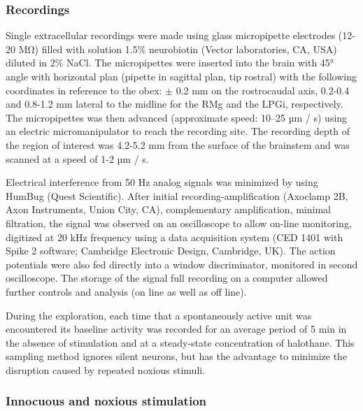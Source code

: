 \documentclass[a4paper,12pt,twoside]{report}
\begin{document}
\subsubsection{Recordings}

Single extracellular recordings were made using glass micropipette electrodes (12-20 MΩ) filled with solution 1.5\% neurobiotin (Vector laboratories, CA, USA) diluted in 2\% NaCl. The micropipettes were inserted into the brain with 45° angle with horizontal plan (pipette in sagittal plan, tip rostral) with the following coordinates in reference to the obex: $\pm$ 0.2 mm on the rostrocaudal axis, 0.2-0.4 and 0.8-1.2 mm lateral to the midline for the RMg and the LPGi, respectively. The micropipettes was then advanced (approximate speed: 10–25 µm / s) using an electric micromanipulator to reach the recording site. The recording depth of the region of interest was 4.2-5.2 mm from the surface of the brainstem and was scanned at a speed of 1-2 µm / s.

Electrical interference from 50 Hz analog signals was minimized by using HumBug (Quest Scientific). After initial recording-amplification (Axoclamp 2B, Axon Instruments, Union City, CA), complementary amplification, minimal filtration, the signal was observed on an oscilloscope to allow on-line monitoring, digitized at 20 kHz frequency using a data acquisition system (CED 1401 with Spike 2 software; Cambridge Electronic Design, Cambridge, UK). The action potentials were also fed directly into a window discriminator, monitored in second oscilloscope. The storage of the signal full recording on a computer allowed further controls and analysis (on line as well as off line).

During the exploration, each time that a spontaneously active unit was encountered its baseline activity was recorded for an average period of 5 min in the absence of stimulation and at a steady-state concentration of halothane. This sampling method ignores silent neurons, but has the advantage to minimize the disruption caused by repeated noxious stimuli.

\subsubsection{Innocuous and noxious stimulation}
\end{document}
